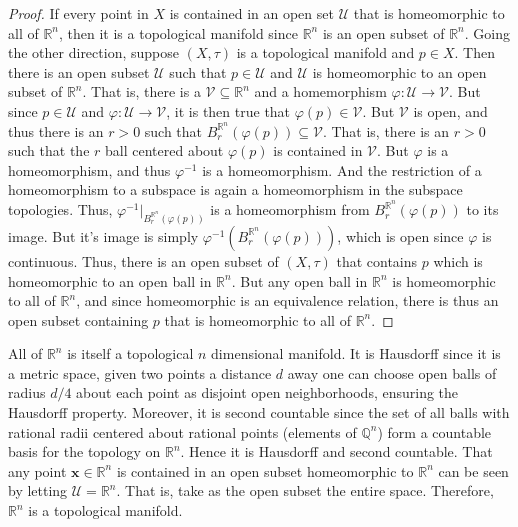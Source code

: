\documentclass{article}                                                        %
\begin{document}
        \begin{proof}
            If every point in $X$ is contained in an open set $\mathcal{U}$ that
            is homeomorphic to all of $\mathbb{R}^{n}$, then it is a topological
            manifold since $\mathbb{R}^{n}$ is an open subset of
            $\mathbb{R}^{n}$. Going the other direction, suppose $(X,\tau)$ is a
            topological manifold and $p\in{X}$. Then there is an open subset
            $\mathcal{U}$ such that $p\in\mathcal{U}$ and $\mathcal{U}$ is
            homeomorphic to an open subset of $\mathbb{R}^{n}$. That is, there
            is a $\mathcal{V}\subseteq\mathbb{R}^{n}$ and a homemorphism
            $\varphi:\mathcal{U}\rightarrow\mathcal{V}$. But since
            $p\in\mathcal{U}$ and $\varphi:\mathcal{U}\rightarrow\mathcal{V}$,
            it is then true that $\varphi(p)\in\mathcal{V}$. But $\mathcal{V}$
            is open, and thus there is an $r>0$ such that
            $B_{r}^{\mathbb{R}^{n}}(\varphi(p))\subseteq\mathcal{V}$. That is,
            there is an $r>0$ such that the $r$ ball centered about $\varphi(p)$
            is contained in $\mathcal{V}$. But $\varphi$ is a homeomorphism, and
            thus $\varphi^{\minus{1}}$ is a homeomorphism. And the restriction
            of a homeomorphism to a subspace is again a homeomorphism in the
            subspace topologies. Thus,
            $\varphi^{\minus{1}}|_{B_{r}^{\mathbb{R}^{n}}(\varphi(p))}$ is a
            homeomorphism from $B_{r}^{\mathbb{R}^{n}}(\varphi(p))$ to its
            image. But it's image is simply
            $\varphi^{\minus{1}}(B_{r}^{\mathbb{R}^{n}}(\varphi(p)))$, which is
            open since $\varphi$ is continuous. Thus, there is an open subset of
            $(X,\tau)$ that contains $p$ which is homeomorphic to an open ball
            in $\mathbb{R}^{n}$. But any open ball in $\mathbb{R}^{n}$ is
            homeomorphic to all of $\mathbb{R}^{n}$, and since homeomorphic is
            an equivalence relation, there is thus an open subset containing $p$
            that is homeomorphic to all of $\mathbb{R}^{n}$.
        \end{proof}
        \begin{example}
            All of $\mathbb{R}^{n}$ is itself a topological $n$ dimensional
            manifold. It is Hausdorff since it is a metric space, given two
            points a distance $d$ away one can choose open balls of radius
            $d/4$ about each point as disjoint open neighborhoods, ensuring the
            Hausdorff property. Moreover, it is second countable since the set
            of all balls with rational radii centered about rational points
            (elements of $\mathbb{Q}^{n}$) form a countable basis for the
            topology on $\mathbb{R}^{n}$. Hence it is Hausdorff and second
            countable. That any point $\mathbf{x}\in\mathbb{R}^{n}$ is contained
            in an open subset homeomorphic to $\mathbb{R}^{n}$ can be seen by
            letting $\mathcal{U}=\mathbb{R}^{n}$. That is, take as the open
            subset the entire space. Therefore, $\mathbb{R}^{n}$ is a
            topological manifold.
        \end{example}
\end{document}
